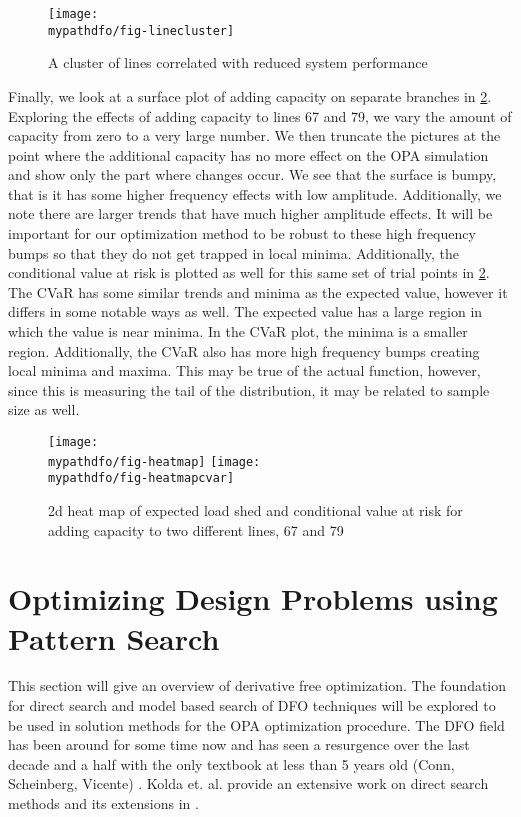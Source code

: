 \begin{figure}
\centering
\texttt{[image: \\mypathdfo/fig-linecluster]}
\caption{A cluster of lines correlated with reduced system performance}
\label{fig:cluster}
\end{figure}

Finally, we look at a surface plot of adding capacity on separate branches in \cref{fig:heatmap}.  Exploring the effects of adding capacity to lines 67 and 79, we vary the amount of capacity from zero to a very large number.  We then truncate the pictures at the point where the additional capacity has no more effect on the OPA simulation and show only the part where changes occur.  We see that the surface is bumpy, that is it has some higher frequency effects with low amplitude.  Additionally, we note there are larger trends that have much higher amplitude effects.  It will be important for our optimization method to be robust to these high frequency bumps so that they do not get trapped in local minima.  Additionally, the conditional value at risk is plotted as well for this same set of trial points in \cref{fig:heatmap}. The CVaR has some similar trends and minima as the expected value, however it differs in some notable ways as well.  The expected value has a large region in which the value is near minima.  In the CVaR plot, the minima is a smaller region.  Additionally, the CVaR also has more high frequency bumps creating local minima and maxima.  This may be true of the actual function, however, since this is measuring the tail of the distribution, it may be related to sample size as well.

\begin{figure}
\centering
\texttt{[image: \\mypathdfo/fig-heatmap]}
\texttt{[image: \\mypathdfo/fig-heatmapcvar]}
\caption[Expected load shed and conditional value at risk for capacity expansion]{2d heat map of expected load shed and conditional value at risk for adding capacity to two different lines, 67 and 79}\label{fig:heatmap}
\end{figure}



\section{Optimizing Design Problems using Pattern Search}

This section will give an overview of derivative free optimization.  The foundation for direct search and model based search of DFO techniques will be explored to be used in solution methods for the OPA optimization procedure.  The DFO field has been around for some time now and has seen a resurgence over the last decade and a half with the only textbook at less than 5 years old (Conn, Scheinberg, Vicente) \cite{conn_2009}.  Kolda et. al. provide an extensive work on direct search methods and its extensions in \cite{kolda_2003}. 

